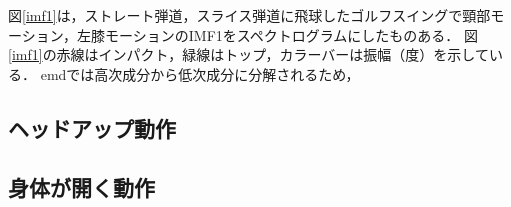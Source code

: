 図\ref{imf1}は，ストレート弾道，スライス弾道に飛球したゴルフスイングで頸部モーション，左膝モーションのIMF1をスペクトログラムにしたものある．
図\ref{imf1}の赤線はインパクト，緑線はトップ，カラーバーは振幅（度）を示している．
emdでは高次成分から低次成分に分解されるため，


\subsection{ヘッドアップ動作}
\subsection{身体が開く動作}